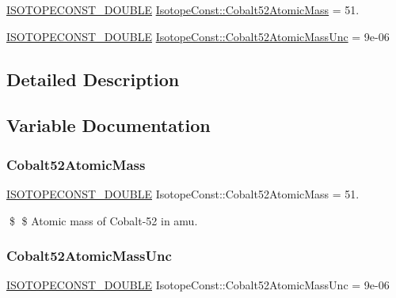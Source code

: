 \begin{DoxyCompactItemize}
\item 
\mbox{\hyperlink{group___isotope_const-_macros_ga8f45a7272ce02c0b4c65c44636ed719a}{I\+S\+O\+T\+O\+P\+E\+C\+O\+N\+S\+T\+\_\+\+D\+O\+U\+B\+LE}} \mbox{\hyperlink{group___isotope_const-_cobalt-_co52_ga577e707c5cf945db5601331e866dcfc2}{Isotope\+Const\+::\+Cobalt52\+Atomic\+Mass}} = 51.
\item 
\mbox{\hyperlink{group___isotope_const-_macros_ga8f45a7272ce02c0b4c65c44636ed719a}{I\+S\+O\+T\+O\+P\+E\+C\+O\+N\+S\+T\+\_\+\+D\+O\+U\+B\+LE}} \mbox{\hyperlink{group___isotope_const-_cobalt-_co52_gaa112c0bee4b2e6318282da2bf07e5731}{Isotope\+Const\+::\+Cobalt52\+Atomic\+Mass\+Unc}} = 9e-\/06
\end{DoxyCompactItemize}


\subsection{Detailed Description}


\subsection{Variable Documentation}
\mbox{\label{group___isotope_const-_cobalt-_co52_ga577e707c5cf945db5601331e866dcfc2}} 
\subsubsection{\texorpdfstring{Cobalt52\+Atomic\+Mass}{Cobalt52AtomicMass}}
{\footnotesize\ttfamily \mbox{\hyperlink{group___isotope_const-_macros_ga8f45a7272ce02c0b4c65c44636ed719a}{I\+S\+O\+T\+O\+P\+E\+C\+O\+N\+S\+T\+\_\+\+D\+O\+U\+B\+LE}} Isotope\+Const\+::\+Cobalt52\+Atomic\+Mass = 51.}

\$ \$ Atomic mass of Cobalt-\/52 in amu. \mbox{\label{group___isotope_const-_cobalt-_co52_gaa112c0bee4b2e6318282da2bf07e5731}} 
\subsubsection{\texorpdfstring{Cobalt52\+Atomic\+Mass\+Unc}{Cobalt52AtomicMassUnc}}
{\footnotesize\ttfamily \mbox{\hyperlink{group___isotope_const-_macros_ga8f45a7272ce02c0b4c65c44636ed719a}{I\+S\+O\+T\+O\+P\+E\+C\+O\+N\+S\+T\+\_\+\+D\+O\+U\+B\+LE}} Isotope\+Const\+::\+Cobalt52\+Atomic\+Mass\+Unc = 9e-\/06}

